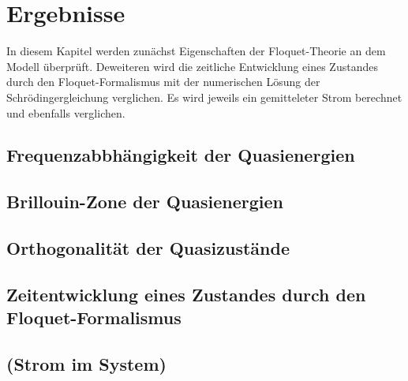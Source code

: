 \chapter{Ergebnisse}
In diesem Kapitel werden zunächst
Eigenschaften der Floquet-Theorie an dem Modell überprüft.
Deweiteren wird die zeitliche Entwicklung
eines Zustandes durch den
Floquet-Formalismus mit der numerischen Lösung der
Schrödingergleichung verglichen. Es wird jeweils ein gemitteleter Strom berechnet und
ebenfalls verglichen.
\section{Frequenzabbhängigkeit der Quasienergien}



\section{Brillouin-Zone der Quasienergien}

\section{Orthogonalität der Quasizustände}

\section{Zeitentwicklung eines Zustandes durch den Floquet-Formalismus}

\section{(Strom im System)}
